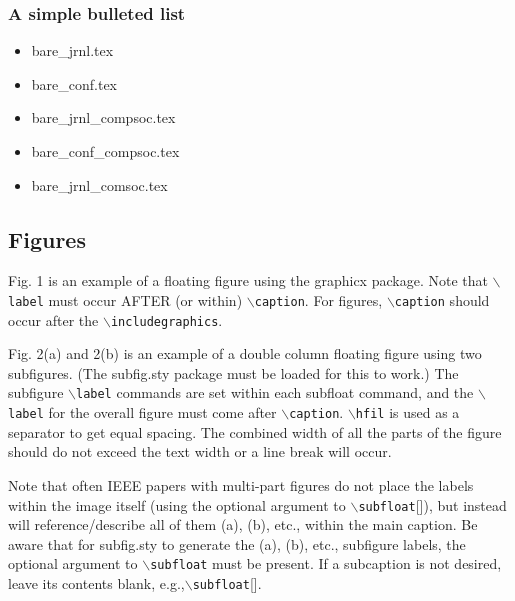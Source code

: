 \documentclass[lettersize,journal]{IEEEtran}
\begin{document}
\subsubsection*{\bf A simple bulleted list}
\begin{itemize}
\item{bare\_jrnl.tex}
\item{bare\_conf.tex}
\item{bare\_jrnl\_compsoc.tex}
\item{bare\_conf\_compsoc.tex}
\item{bare\_jrnl\_comsoc.tex}
\end{itemize}





\subsection{Figures}
Fig. 1 is an example of a floating figure using the graphicx package.
 Note that $\backslash${\tt{label}} must occur AFTER (or within) $\backslash${\tt{caption}}.
 For figures, $\backslash${\tt{caption}} should occur after the $\backslash${\tt{includegraphics}}.


Fig. 2(a) and 2(b) is an example of a double column floating figure using two subfigures.
 (The subfig.sty package must be loaded for this to work.)
 The subfigure $\backslash${\tt{label}} commands are set within each subfloat command,
 and the $\backslash${\tt{label}} for the overall figure must come after $\backslash${\tt{caption}}.
 $\backslash${\tt{hfil}} is used as a separator to get equal spacing.
 The combined width of all the parts of the figure should do not exceed the text width or a line break will occur.
%

Note that often IEEE papers with multi-part figures do not place the labels within the image itself (using the optional argument to $\backslash${\tt{subfloat}}[]), but instead will
 reference/describe all of them (a), (b), etc., within the main caption.
 Be aware that for subfig.sty to generate the (a), (b), etc., subfigure
 labels, the optional argument to $\backslash${\tt{subfloat}} must be present. If a
 subcaption is not desired, leave its contents blank,
 e.g.,$\backslash${\tt{subfloat}}[].
\end{document}
